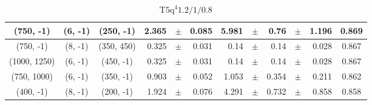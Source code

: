 \documentclass[12pt]{paper}
\newcommand{\TFiveqqqqHM}{\ensuremath{\textrm{T5q}^{4} 1.2/1/0.8}\xspace}
\begin{document}
\begin{table}[ht]
\begin{center}
{\begin{tabular}{|c|c|c|rrr|rrrrr|c|}
(750, -1)&(6, -1)&(250, -1)&2.365&$\pm$&0.085&5.981&$\pm$&0.76&$\pm$&1.196&0.869\\\hline
(750, -1)&(8, -1)&(350, 450)&0.325&$\pm$&0.031&0.14&$\pm$&0.14&$\pm$&0.028&0.867\\\hline
(1000, 1250)&(6, -1)&(450, -1)&0.325&$\pm$&0.031&0.14&$\pm$&0.14&$\pm$&0.028&0.867\\\hline
(750, 1000)&(6, -1)&(350, -1)&0.903&$\pm$&0.052&1.053&$\pm$&0.354&$\pm$&0.211&0.862\\\hline
(400, -1)&(8, -1)&(200, -1)&1.924&$\pm$&0.076&4.291&$\pm$&0.732&$\pm$&0.858&0.858\\\hline
\end{tabular}}\end{center}\caption{\TFiveqqqqHM }\end{table}
\end{document}
